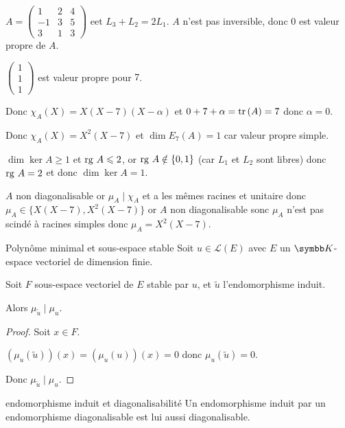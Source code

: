 \begin{exemple}
    $A = \begin{pmatrix}
        1 & 2 & 4 \\
        -1 & 3 & 5 \\
        3 & 1 & 3 
    \end{pmatrix}$ eet $L_3 + L_2 = 2L_1$. $A$ n'est pas inversible, donc $0$ est valeur propre de $A$.

    $\begin{pmatrix}
        1 \\ 1 \\ 1
    \end{pmatrix}$ est valeur propre pour $7$. 

    Donc $\chi_A(X) = X(X - 7)(X - \alpha)$ et $0 + 7 + \alpha = \operatorname{tr} \,(A) = 7$ donc $\alpha = 0$.

    Donc $\chi_A(X) = X^2 (X - 7)$ et $\dim E_7(A) = 1$ car valeur propre simple.

    $\dim \ker A \geqslant 1$ et $\operatorname{rg} \, A \leqslant 2$, or $\operatorname{rg} \, A \notin \{0, 1\}$ (car $L_1$ et $L_2$
    sont libres) donc $\operatorname{rg} \, A = 2$ et donc $\dim \ker A = 1$.

    $A$ non diagonalisable or $\mu_A \mid \chi_A$ et a les mêmes racines et unitaire donc 
    $\mu_A \in \{X(X - 7), X^2(X - 7)\}$ or $A$ non diagonalisable sonc $\mu_A$ n'est pas scindé à racines simples donc 
    $\mu_A = X^2 (X - 7)$.
\end{exemple}

\begin{proposition}{Polynôme minimal et sous-espace stable}{}
    Soit $u \in \mathscr L(E)$ avec $E$ un $\K$-espace vectoriel de dimension finie. 

    Soit $F$ sous-espace vectoriel de $E$ stable par $u$, et $\tilde u$ l'endomorphisme induit. 

    Alors $\mu_{\tilde u} \mid \mu_u$.
\end{proposition}


\begin{proof}
    Soit $x \in F$.

    $(\mu_u(\tilde u))(x) = (\mu_u(u))(x) = 0$ donc $\mu_u(\tilde u) = 0$.

    Donc $\mu_{\tilde u} \mid \mu_u$.
\end{proof}

\begin{corollaire}{endomorphisme induit et diagonalisabilité}{}
    Un endomorphisme induit par un endomorphisme diagonalisable est lui aussi diagonalisable.
\end{corollaire}

